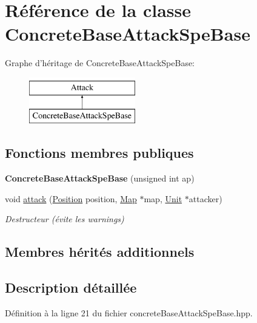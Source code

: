 \hypertarget{classConcreteBaseAttackSpeBase}{\section{Référence de la classe Concrete\+Base\+Attack\+Spe\+Base}
\label{classConcreteBaseAttackSpeBase}
}
Graphe d'héritage de Concrete\+Base\+Attack\+Spe\+Base\+:\begin{figure}[H]
\begin{center}
\leavevmode
\includegraphics[height=2.000000cm]{classConcreteBaseAttackSpeBase}
\end{center}
\end{figure}
\subsection*{Fonctions membres publiques}
\begin{DoxyCompactItemize}
\item 
\hypertarget{classConcreteBaseAttackSpeBase_a5680fdba17590e8d2cb81be5340206e7}{{\bfseries Concrete\+Base\+Attack\+Spe\+Base} (unsigned int ap)}\label{classConcreteBaseAttackSpeBase_a5680fdba17590e8d2cb81be5340206e7}

\item 
void \hyperlink{classConcreteBaseAttackSpeBase_a4b215e51d3146516ecf77e23d19a92de}{attack} (\hyperlink{classPosition}{Position} position, \hyperlink{classMap}{Map} $\ast$map, \hyperlink{classUnit}{Unit} $\ast$attacker)
\begin{DoxyCompactList}\small\item\em Destructeur (évite les warnings) \end{DoxyCompactList}\end{DoxyCompactItemize}
\subsection*{Membres hérités additionnels}


\subsection{Description détaillée}


Définition à la ligne 21 du fichier concrete\+Base\+Attack\+Spe\+Base.\+hpp.



